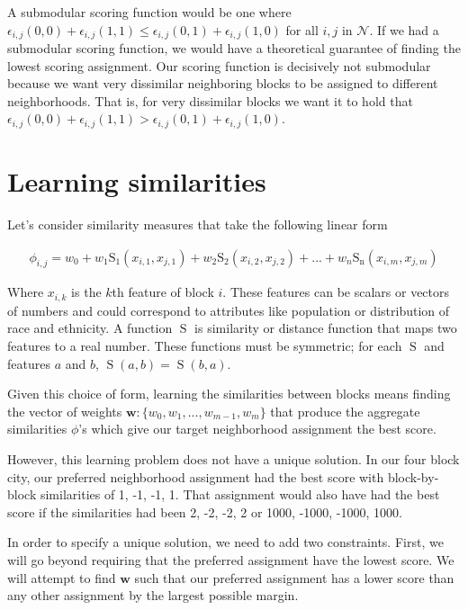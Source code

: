 A submodular scoring function would be one where $\epsilon_{i,j}(0,0)
+ \epsilon_{i,j}(1,1) \leq \epsilon_{i,j}(0,1) + \epsilon_{i,j}(1,0)$
for all $i,j$ in $\mathcal{N}$. If we had a submodular scoring
function, we would have a theoretical guarantee of finding the lowest
scoring assignment. Our scoring function is decisively not submodular
because we want very dissimilar neighboring blocks to be assigned to
different neighborhoods. That is, for very dissimilar blocks we want
it to hold that $\epsilon_{i,j}(0,0) + \epsilon_{i,j}(1,1)
\boldsymbol{>} \epsilon_{i,j}(0,1) + \epsilon_{i,j}(1,0)$.


\section*{Learning similarities}
Let's consider similarity measures that take the following linear form

\begin{align}
\phi_{i,j} = w_0 + w_1\operatorname{S_1}(x_{i,1}, x_{j,1}) +
w_2\operatorname{S_2}(x_{i,2}, x_{j,2}) + ... +
w_n\operatorname{S_n}(x_{i,m},x_{j,m})
\end{align} 

Where $x_{i,k}$ is the $k$th feature of block $i$. These features can
be scalars or vectors of numbers and could correspond to attributes
like population or distribution of race and ethnicity. A function
$\operatorname{S}$ is similarity or distance function that maps two
features to a real number. These functions must be symmetric; for each
$\operatorname{S}$ and features $a$ and $b$, $\operatorname{S}(a,b) =
\operatorname{S}(b,a)$.

Given this choice of form, learning the similarities between blocks
means finding the vector of weights $\mathbf{w}: \{w_0, w_1, ...,
w_{m-1}, w_m\}$ that produce the aggregate similarities $\phi$'s which
give our target neighborhood assignment the best score. 

However, this learning problem does not have a unique solution. In our
four block city, our preferred neighborhood assignment had the best
score with block-by-block similarities of 1, -1, -1, 1. That
assignment would also have had the best score if the similarities had
been 2, -2, -2, 2 or 1000, -1000, -1000,
1000. 

In order to specify a unique solution, we need to add two
constraints. First, we will go beyond requiring that the preferred
assignment have the lowest score. We will attempt to find $\mathbf{w}$
such that our preferred assignment has a lower score than any other
assignment by the largest possible margin. 

